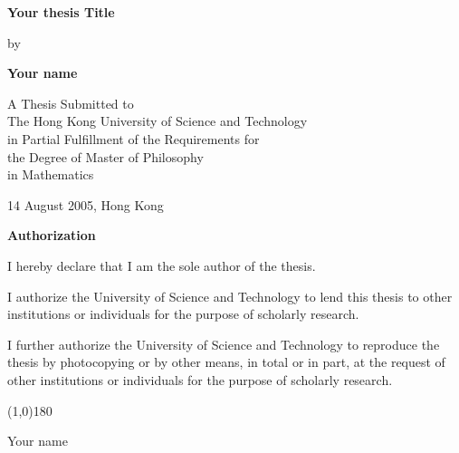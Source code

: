 
\null\vspace{0.5in}
\begin{center}
{\Large\bf Your thesis Title}
\vspace{2.5cm}

{\large by}
\vspace{0.5cm}

{\large\bf Your name}\normalsize
\vspace{1cm}

A Thesis Submitted to \\
The Hong Kong University of Science and Technology \\
in Partial Fulfillment of the Requirements for \\
the Degree of Master of Philosophy \\
in Mathematics
\vspace{1.5cm}

14 August 2005, Hong Kong
\end{center}
\thispagestyle{empty}
\newpage

\begin{center}{\Large\bf Authorization}\normalsize
\end{center}
\vspace{0.5cm}

I hereby declare that I am the sole author of the thesis.

\vspace{0.5cm}

I authorize the University of Science and Technology to lend this thesis
to other institutions or individuals for the purpose of scholarly research.

\vspace{0.5cm}

I further authorize the University of Science and Technology to
reproduce the thesis by photocopying or by other means, in total or in
part, at the request of other institutions or individuals for the
purpose of scholarly research.

\vspace{1.5cm}

\begin{center}
\line(1,0){180}
\smallskip

Your name
\end{center}

\newpage

